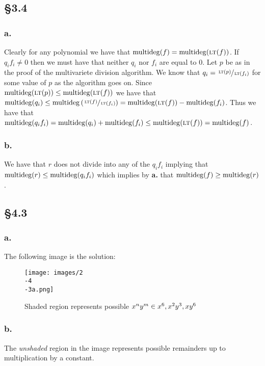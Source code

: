 \documentclass[letterpaper]{article}
\begin{document}
\clearpage

\subsection*{\S 3.4}

\subsubsection*{a.}

Clearly for any polynomial we have that $\operatorname{multideg}(f) = \operatorname{multideg}(\operatorname{\textsc{lt}}(f))$.
If $q_{i} f_{i} \neq 0$ then we must have that neither $q_{i}$ nor $f_{i}$ are equal to $0$.
Let $p$ be as in the proof of the multivariete division algorithm.
We know that $q_{i} = \sfrac{\operatorname{\textsc{lt}}(p)}{\operatorname{\textsc{lt}}(f_{i})}$ for some value of $p$ as the algorithm goes on.
Since $\operatorname{multideg}(\operatorname{\textsc{lt}}(p)) \leq \operatorname{multideg}(\operatorname{\textsc{lt}}(f))$ we have that $\mdeg(q_{i}) \leq \mdeg\pqty{\sfrac{\lt(f)}{\lt(f_{i})}} = \mdeg(\lt(f)) - \mdeg(f_{i})$.
Thus we have that $\operatorname{multideg}(q_{i}f_{i}) = \operatorname{multideg}(q_{i}) + \operatorname{multideg}(f_{i}) \leq \operatorname{multideg}(\operatorname{\textsc{lt}}(f)) = \operatorname{multideg}(f)$.

\subsubsection*{b.}

We have that $r$ does not divide into any of the $q_{i}f_{i}$ implying that $\operatorname{multideg}(r) \leq \operatorname{multideg}(q_{i} f_{i})$ which implies by \textbf{a.} that $\operatorname{multideg}(f) \geq \operatorname{multideg}(r)$.

\subsection*{\S 4.3}

\subsubsection*{a.}

The following image is the solution:

\begin{figure}[H]
  \centering
  \texttt{[image: images/2\\-4\\-3a.png]}
  \caption{Shaded region represents possible $x^{n}y^{m} \in \gen{x^{6}, x^{2}y^{3}, xy^{6}}$}
\end{figure}

\subsubsection*{b.}

The \emph{unshaded} region in the image represents possible remainders up to multiplication by a constant.
\end{document}
